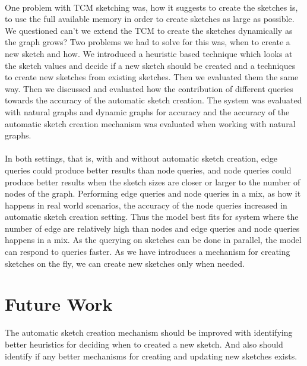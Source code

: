 \documentclass[12pt]{report}
\numberwithin{figure}{section}
\numberwithin{table}{section}
\begin{document}
\paragraph{}

One problem with TCM sketching was, how it suggests to create the sketches is, to use the full available  memory in order to create sketches as large as possible. We questioned can't we extend the TCM to create the sketches dynamically as the graph grows? Two problems we had to solve for this was, when to create a new sketch and how. We introduced a heuristic based technique which looks at the sketch values and decide if a new sketch should be created and a techniques to create new sketches from existing sketches. Then we evaluated them the same way. Then we discussed and evaluated how the contribution of different queries towards the accuracy of the automatic sketch creation. The system was evaluated with natural graphs and dynamic graphs for accuracy and the accuracy of the automatic sketch creation mechanism was evaluated when working with natural graphs.

\paragraph{}

In both settings, that is, with and without automatic sketch creation, edge queries could produce better results than node queries, and node queries could produce better results when the sketch sizes are closer or larger to the number of nodes of the graph. Performing edge queries and node queries in a mix, as how it happens in real world scenarios, the accuracy of the node queries  increased in automatic sketch creation setting. Thus the model best fits for system where the number of edge are relatively high than nodes and edge queries and node queries happens in a mix. As the querying on sketches can be done in parallel, the model can respond to queries faster. As we have introduces a mechanism for creating sketches on the fly, we can create new sketches only when needed.

\section{Future Work}

The automatic sketch creation mechanism should be improved with identifying better heuristics for deciding when to created a new sketch. And also should identify if any better mechanisms for creating  and  updating  new sketches exists.  
\end{document}
